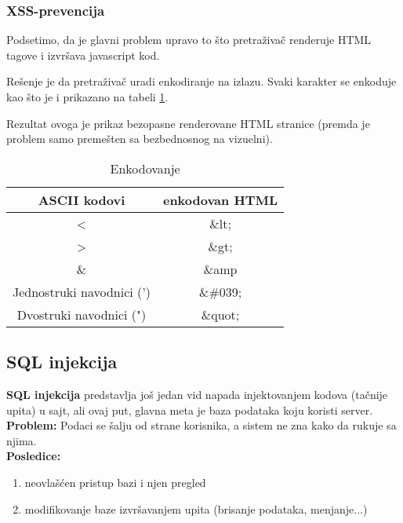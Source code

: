 \documentclass[a4paper]{article}
\begin{document}
\subsubsection{XSS-prevencija}

Podsetimo, da je glavni problem upravo to što pretraživač renderuje HTML tagove i izvršava javascript kod.  

Rešenje je da pretraživač uradi enkodiranje na izlazu. Svaki karakter se enkoduje kao što je i prikazano na tabeli \ref{kodiranje}.

Rezultat ovoga je prikaz bezopasne renderovane HTML stranice (premda je problem samo premešten sa bezbednosnog na vizuelni).

\begin{table}[ht]

\begin{center}
\caption{Enkodovanje}
\begin{tabular}{ | c | c | }
\hline
	\rowcolor{yellow}
\textbf{ASCII kodovi} & \textbf{enkodovan HTML} \\
	\hline
 < & \&lt; \\ 
 \hline
 > & \&gt; \\  
 \hline
 \& & \&amp \\
 \hline
 Jednostruki navodnici (') & \&\#039;\\
 \hline
 Dvostruki navodnici (") & \&quot;\\  
 \hline  
\end{tabular}

\label{kodiranje}
\end{center}
\end{table}

\subsection{SQL injekcija}

\textbf{SQL injekcija} predstavlja još jedan vid napada injektovanjem kodova (tačnije upita) u sajt, ali ovaj put, glavna meta je baza podataka koju koristi server.\\
\textbf{Problem:} Podaci se šalju od strane korisnika, a sistem ne zna kako da rukuje sa njima.\\
\textbf{Posledice:} 
\begin{enumerate}
	\item neovlašćen pristup bazi i njen pregled
	\item modifikovanje baze izvršavanjem upita (brisanje podataka, menjanje...)
\end{enumerate}
\end{document}
